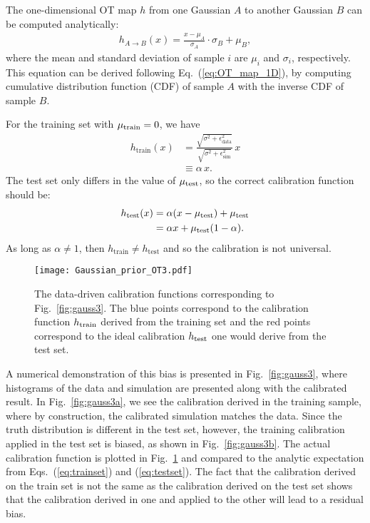 \documentclass[aps,prd,reprint,preprintnumbers,superscriptaddress,nofootinbib,longbibliography,floatfix]{revtex4-1}
\DeclareRobustCommand{\Fig}[1]{Fig.~\ref{fig:#1}}
\DeclareRobustCommand{\Eq}[1]{Eq.~(\ref{eq:#1})}
\DeclareRobustCommand{\Eqs}[2]{Eqs.~(\ref{eq:#1}) and (\ref{eq:#2})}
\begin{document}
The one-dimensional OT map $h$ from one Gaussian $A$ to another Gaussian $B$ can be computed analytically:
%
\begin{align}
\label{eq:OTgaussian}
    h_{A\rightarrow B}(x)=\frac{x-\mu_A}{\sigma_A}\cdot\sigma_B+\mu_B,
\end{align}
%
where the mean and standard deviation of sample $i$ are $\mu_i$ and $\sigma_i$, respectively.
%
This equation can be derived following \Eq{OT_map_1D}, by computing cumulative distribution function (CDF) of sample $A$ with the inverse CDF of sample $B$.



For the training set with $\mu_{\rm train} = 0$, we have
%
\begin{align}
    \label{eq:testset}
    h_\text{train}(x) &= \frac{\sqrt{\sigma^2+\epsilon_\text{data}^2}}{\sqrt{\sigma^2+\epsilon_\text{sim}^2}} \, x \\ \nonumber
    &\equiv \alpha \, x.
\end{align}
%
The test set only differs in the value of $\mu_{\rm test}$, so the correct calibration function should be:
%
\begin{align}
\label{eq:trainset}
    h_\text{test}(x)&=\alpha(x-\mu_{\rm test})+\mu_{\rm test}\\
    \nonumber
    &=\alpha x + \mu_{\rm test}(1-\alpha).
\end{align}
%
As long as $\alpha\neq 1$, then $h_\text{train}\neq h_\text{test}$ and so the calibration is not universal.


\begin{figure}[t]
    \centering
    \texttt{[image: Gaussian\_prior\_OT3.pdf]}
    \caption{
    The data-driven calibration functions corresponding to \Fig{gauss3}.
    The blue points correspond to the calibration function $h_{\rm train}$ derived from the training set and the red points correspond to the ideal calibration $h_{\rm test}$ one would derive from the test set.}
    \label{fig:gauss4}
\end{figure}


A numerical demonstration of this bias is presented in \Fig{gauss3}, where histograms of the data and simulation are presented along with the calibrated result.
%
In \Fig{gauss3a}, we see the calibration derived in the training sample, where by construction, the calibrated simulation matches the data.
%
Since the truth distribution is different in the test set, however,
the training calibration applied in the test set is biased, as shown in \Fig{gauss3b}.
%
The actual calibration function is plotted in \Fig{gauss4} and compared to the analytic expectation from \Eqs{trainset}{testset}.
%
The fact that the calibration derived on the train set is not the same as the calibration derived on the test set shows that the calibration derived in one and applied to the other will lead to a residual bias.
\end{document}
